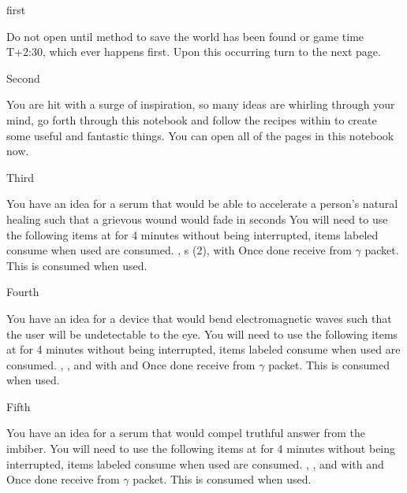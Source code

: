 \documentclass[greennotebook]{guildcamp3} %
\begin{document}
	
	\startnotebook{\nSciOneRecipes{}}
	
	\begin{page}{first}
		
		Do not open until method to save the world has been found or game time T+2:30, which ever happens first. Upon this occurring turn to the next page.
		
	\end{page}
	
	\begin{page}{Second}
		
		You are hit with a surge of inspiration, so many ideas are whirling through your mind, go forth through this notebook and follow the recipes within to create some useful and fantastic things. You can open all of the pages in this notebook now.
		
	\end{page}
	
	\begin{page}{Third}
		
		You have an idea for a serum that would be able to accelerate a person's natural healing such that a grievous wound would fade in seconds
		You will need to use the following items at \sSciWorkbench{} for 4 minutes without being interrupted, items labeled consume when used are consumed.
		\iPenicillin{}, \iTransistor{}s (2), \iFlashlight{} with \iScrewdriver{}
	Once done receive \iHealthRemedy{} from $\gamma$ packet. This is consumed when used. 
	
\end{page}

\begin{page}{Fourth}
	
	You have an idea for a device that would bend electromagnetic waves such that the user will be undetectable to the eye.
	You will need to use the following items at \sSciWorkbench{} for 4 minutes without being interrupted, items labeled consume when used are consumed.
	\iCircuitBoard{}, \iNiobiumCarbide{}, and \iTransistor{} with \iDiamondDrill{} and \iMultitool{}
	Once done receive \iCloakingDevice{} from $\gamma$ packet. This is consumed when used. 
	
\end{page}

\begin{page}{Fifth}
	
	You have an idea for a serum that would compel truthful answer from the imbiber.
	You will need to use the following items at \sSciWorkbench{} for 4 minutes without being interrupted, items labeled consume when used are consumed.
	\iCompoundNine{}, \iBloodPlasma{}, and \iOil{} with \iCentrifuge{} and \iTestTube{}
	Once done receive \iTruthSerum{} from $\gamma$ packet. This is consumed when used. 
	
\end{page}
\end{document}
